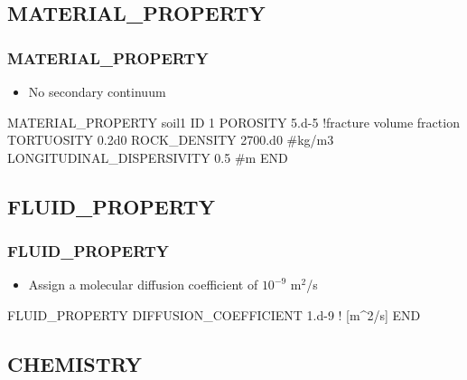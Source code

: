 \documentclass{beamer}
\newcommand\bluecomment[1]{{{\color{blue} #1}}}
\begin{document}
\subsection{MATERIAL\_PROPERTY}

\begin{frame}\frametitle{MATERIAL\_PROPERTY}

\begin{itemize}
  \item No secondary continuum
\end{itemize}

\begin{semiverbatim}
MATERIAL_PROPERTY soil1
  ID 1  
  POROSITY 5.d-5  \bluecomment{!fracture volume fraction}
  TORTUOSITY 0.2d0
  ROCK_DENSITY 2700.d0 #kg/m3
  LONGITUDINAL_DISPERSIVITY 0.5 #m
END
\end{semiverbatim}

\end{frame}

\subsection{FLUID\_PROPERTY}

\begin{frame}\frametitle{FLUID\_PROPERTY}

\begin{itemize}
  \item Assign a molecular diffusion coefficient of $10^{-9}$ m$^2$/s
\end{itemize}

\begin{semiverbatim}

FLUID_PROPERTY
  DIFFUSION_COEFFICIENT 1.d-9   \bluecomment{! [m^2/s]}
END
\end{semiverbatim}

\end{frame}

\subsection{CHEMISTRY}
\end{document}

